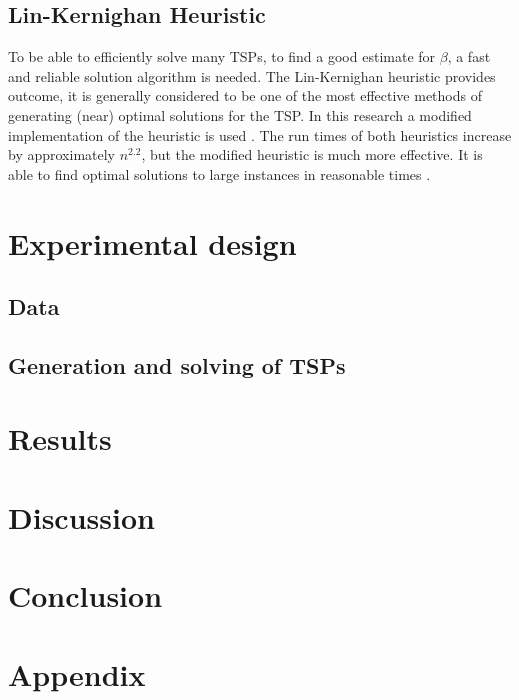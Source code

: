\documentclass[12pt]{article}
\numberwithin{equation}{section}
\newcommand{\1}[1]{\,I_{#1}} %
\begin{document}
\subsection{Lin-Kernighan Heuristic}
To be able to efficiently solve many TSPs, to find a good estimate for $\beta$, a fast and reliable
solution algorithm is needed. The Lin-Kernighan \cite{lin1973effective} heuristic provides outcome,
it is generally considered to be one of the most effective methods of generating (near) optimal
solutions for the TSP.
In this research a modified implementation of the heuristic is used \cite{helsgaun2000effective}.
The run times of both heuristics increase by approximately $n^{2.2}$, but the modified heuristic is
much more effective. It is able to find optimal solutions to large instances in reasonable times
\cite{helsgaun2000effective}.

\section{Experimental design}
\subsection{Data}
\subsection{Generation and solving of TSPs}
\section{Results}
\section{Discussion}
\section{Conclusion}


\section{Appendix}

\end{document}
